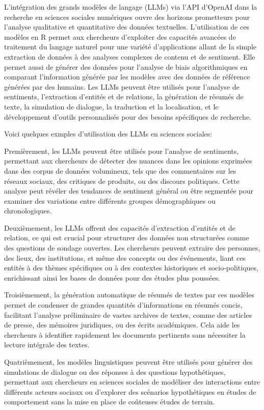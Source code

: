 \documentclass[
  letterpaper,
  DIV=11,
  numbers=noendperiod]{scrreprt}
\begin{document}
L'intégration des grands modèles de langage (LLMs) via l'API d'OpenAI
dans la recherche en sciences sociales numériques ouvre des horizons
prometteurs pour l'analyse qualitative et quantitative des données
textuelles. L'utilisation de ces modèles en R permet aux chercheurs
d'exploiter des capacités avancées de traitement du langage naturel pour
une variété d'applications allant de la simple extraction de données à
des analyses complexes de contenu et de sentiment. Elle permet aussi de
générer des données pour l'analyse de biais algorithmiques en comparant
l'information générée par les modèles avec des données de référence
générées par des humains. Les LLMs peuvent être utilisés pour l'analyse
de sentiments, l'extraction d'entités et de relations, la génération de
résumés de texte, la simulation de dialogue, la traduction et la
localisation, et le développement d'outils personnalisés pour des
besoins spécifiques de recherche.

Voici quelques exmples d'utilisation des LLMs en sciences sociales:

Premièrement, les LLMs peuvent être utilisés pour l'analyse de
sentiments, permettant aux chercheurs de détecter des nuances dans les
opinions exprimées dans des corpus de données volumineux, tels que des
commentaires sur les réseaux sociaux, des critiques de produits, ou des
discours politiques. Cette analyse peut révéler des tendances de
sentiment général ou être segmentée pour examiner des variations entre
différents groupes démographiques ou chronologiques.

Deuxièmement, les LLMs offrent des capacités d'extraction d'entités et
de relation, ce qui est crucial pour structurer des données non
structurées comme des questions de sondage ouvertes. Les chercheurs
peuvent extraire des personnes, des lieux, des institutions, et même des
concepts ou des événements, liant ces entités à des thèmes spécifiques
ou à des contextes historiques et socio-politiques, enrichissant ainsi
les bases de données pour des études plus poussées.

Troisièmement, la génération automatique de résumés de textes par ces
modèles permet de condenser de grandes quantités d'informations en
résumés concis, facilitant l'analyse préliminaire de vastes archives de
textes, comme des articles de presse, des mémoires juridiques, ou des
écrits académiques. Cela aide les chercheurs à identifier rapidement les
documents pertinents sans nécessiter la lecture intégrale des textes.

Quatrièmement, les modèles linguistiques peuvent être utilisés pour
générer des simulations de dialogue ou des réponses à des questions
hypothétiques, permettant aux chercheurs en sciences sociales de
modéliser des interactions entre différents acteurs sociaux ou
d'explorer des scénarios hypothétiques en études de comportement sans la
mise en place de coûteuses études de terrain.
\end{document}
